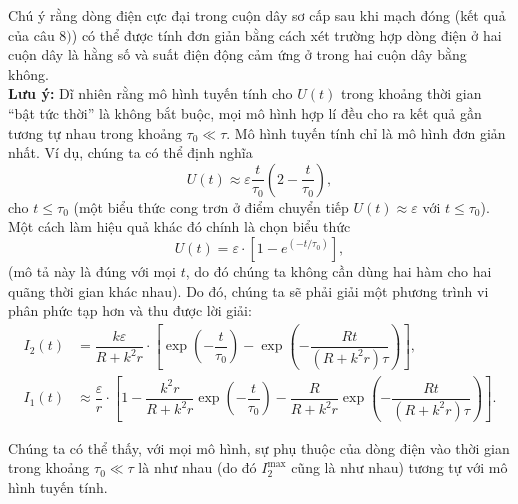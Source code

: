 \begin{loigiai}
\begin{enumerate}[1)]
\begin{center}
\begin{tikzpicture}[x=0.75pt,y=0.75pt,yscale=-1,xscale=1]
 
\end{tikzpicture}
\end{center}
Chú ý rằng dòng điện cực đại trong cuộn dây sơ cấp sau khi mạch đóng (kết quả của câu $8)$) có thể được tính đơn giản bằng cách xét trường hợp dòng điện ở hai cuộn dây là hằng số và suất điện động cảm ứng ở trong hai cuộn dây bằng không.\\
\textbf{Lưu ý:} Dĩ nhiên rằng mô hình tuyến tính cho $U(t)$ trong khoảng thời gian ``bật tức thời'' là không bắt buộc, mọi mô hình hợp lí đều cho ra kết quả gần tương tự nhau trong khoảng $\tau_0 \ll \tau$. Mô hình tuyến tính chỉ là mô hình đơn giản nhất. Ví dụ, chúng ta có thể định nghĩa
     $$U(t) \approx \varepsilon \dfrac{t}{\tau_{0}}\left(2-\dfrac{t}{\tau_{0}}\right),$$
cho $t \leq \tau_0$ (một biểu thức cong trơn ở điểm chuyển tiếp $U(t) \approx \varepsilon$ với $t\leq \tau_0$). Một cách làm hiệu quả khác đó chính là chọn biểu thức
    $$U(t)= \varepsilon \cdot\left[1-e^{ \left(-t / \tau_{0}\right)}\right],$$
(mô tả này là đúng với mọi $t$, do đó chúng ta không cần dùng hai hàm cho hai quãng thời gian khác nhau). Do đó, chúng ta sẽ phải giải một phương trình vi phân phức tạp hơn và thu được lời giải:
\[\begin{aligned}
    I_{2}(t) &= \dfrac{k \varepsilon}{R+k^{2} r} \cdot\left[\exp \left(-\dfrac{t}{\tau_{0}}\right)-\exp \left(-\dfrac{R t}{\left(R+k^{2} r\right) \tau}\right)\right],\\
    I_{1}(t) &\approx \dfrac{\varepsilon}{r} \cdot\left[1-\dfrac{k^{2} r}{R+k^{2} r} \exp \left(-\dfrac{t}{\tau_{0}}\right)-\dfrac{R}{R+k^{2} r} \exp \left(-\dfrac{R t}{\left(R+k^{2} r\right) \tau}\right)\right].
\end{aligned}\]
   
Chúng ta có thể thấy, với mọi mô hình, sự phụ thuộc của dòng điện vào thời gian trong khoảng $\tau_0\ll \tau$ là như nhau (do đó $I_{2}^{\max} $ cũng là như nhau) tương tự với mô hình tuyến tính. 
\end{enumerate}
\end{loigiai}

